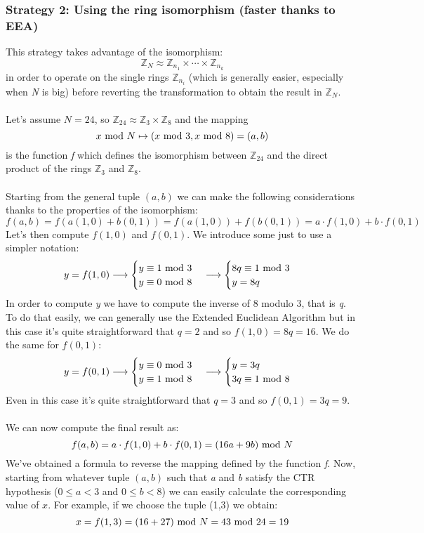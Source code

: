 \subsubsection*{Strategy 2: Using the ring isomorphism (faster thanks to EEA)}
This strategy takes advantage of the isomorphism:
$$\mathbb{Z}_N\approx\mathbb{Z}_{n_1}\times\cdots\times\mathbb{Z}_{n_k}$$
in order to operate on the single rings $\mathbb{Z}_{n_i}$ (which is generally easier, especially when \textit{N} is big) before reverting the transformation to obtain the result in $\mathbb{Z}_N$.\\\\
Let's assume $N=24$, so $\mathbb{Z}_{24}\approx\mathbb{Z}_3\times\mathbb{Z}_8$ and the mapping
$$x\text{ mod } N\mapsto (x\text{ mod }3, x\text{ mod }8)=(a,b)$$
is the function \textit{f} which defines the isomorphism between $\mathbb{Z}_{24}$ and the direct product of the rings $\mathbb{Z}_3$ and $\mathbb{Z}_8$.\\\\
Starting from the general tuple $(a,b)$ we can make the following considerations thanks to the properties of the isomorphism:
$$f(a,b)=f\left(a(1,0)+b(0,1)\right)=f(a(1,0))+f(b(0,1))=a\cdot f(1,0)+b\cdot f(0,1)$$
Let's then compute $f(1,0)$ and $f(0,1)$. We introduce some  just to use a simpler notation:
\begin{equation*}
  y=f(1,0)\longrightarrow
  \begin{cases}
      y\equiv1\text{ mod }3\\
      y\equiv0\text{ mod }8
  \end{cases}\longrightarrow
  \begin{cases}
      8q\equiv1\text{ mod }3\\
      y=8q
  \end{cases}
\end{equation*}
In order to compute \textit{y} we have to compute the inverse of 8 modulo 3, that is \textit{q}. To do that easily, we can generally use the Extended Euclidean Algorithm but in this case it's quite straightforward that $q=2$ and so $f(1,0)=8q=16$. We do the same for $f(0,1)$:
\begin{equation*}
  y=f(0,1)\longrightarrow
  \begin{cases}
      y\equiv0\text{ mod }3\\
      y\equiv1\text{ mod }8
  \end{cases}\longrightarrow
  \begin{cases}
      y=3q\\
      3q\equiv1\text{ mod }8
  \end{cases}
\end{equation*}
Even in this case it's quite straightforward that $q=3$ and so $f(0,1)=3q=9$.\\\\
We can now compute the final result as:
$$f(a,b)=a\cdot f(1,0)+b\cdot f(0,1)=(16a+9b) \text{ mod } N$$
We've obtained a formula to reverse the mapping defined by the function \textit{f}. Now, starting from whatever tuple $(a,b)$ such that \textit{a} and \textit{b} satisfy the CTR hypothesis ($0\le a<3$ and $0\le b<8$) we can easily calculate the corresponding value of $x$. For example, if we choose the tuple (1,3) we obtain:
$$x=f(1,3)=(16+27)\text{ mod } N=43\text{ mod } 24=19$$

